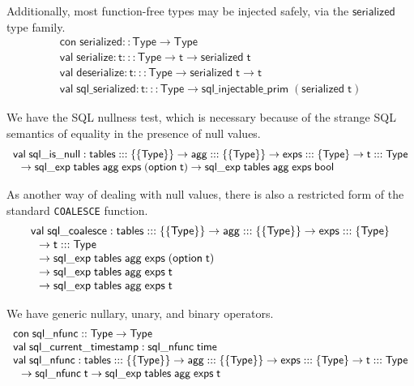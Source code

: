 \documentclass{article}
\newcommand{\cd}[1]{\texttt{#1}}
\newcommand{\mt}[1]{\mathsf{#1}}
\begin{document}
Additionally, most function-free types may be injected safely, via the $\mt{serialized}$ type family.
$$\begin{array}{l}
  \mt{con} \; \mt{serialized} :: \mt{Type} \to \mt{Type} \\
  \mt{val} \; \mt{serialize} : \mt{t} ::: \mt{Type} \to \mt{t} \to \mt{serialized} \; \mt{t} \\
  \mt{val} \; \mt{deserialize} : \mt{t} ::: \mt{Type} \to \mt{serialized} \; \mt{t} \to \mt{t} \\
  \mt{val} \; \mt{sql\_serialized} : \mt{t} ::: \mt{Type} \to \mt{sql\_injectable\_prim} \; (\mt{serialized} \; \mt{t})
\end{array}$$

We have the SQL nullness test, which is necessary because of the strange SQL semantics of equality in the presence of null values.
$$\begin{array}{l}
  \mt{val} \; \mt{sql\_is\_null} : \mt{tables} ::: \{\{\mt{Type}\}\} \to \mt{agg} ::: \{\{\mt{Type}\}\} \to \mt{exps} ::: \{\mt{Type}\} \to \mt{t} ::: \mt{Type} \\
  \hspace{.1in} \to \mt{sql\_exp} \; \mt{tables} \; \mt{agg} \; \mt{exps} \; (\mt{option} \; \mt{t}) \to \mt{sql\_exp} \; \mt{tables} \; \mt{agg} \; \mt{exps} \; \mt{bool}
\end{array}$$

As another way of dealing with null values, there is also a restricted form of the standard \cd{COALESCE} function.
$$\begin{array}{l}
  \mt{val} \; \mt{sql\_coalesce} : \mt{tables} ::: \{\{\mt{Type}\}\} \to \mt{agg} ::: \{\{\mt{Type}\}\} \to \mt{exps} ::: \{\mt{Type}\} \\
  \hspace{.1in} \to \mt{t} ::: \mt{Type} \\
  \hspace{.1in} \to \mt{sql\_exp} \; \mt{tables} \; \mt{agg} \; \mt{exps} \; (\mt{option} \; \mt{t}) \\
  \hspace{.1in} \to \mt{sql\_exp} \; \mt{tables} \; \mt{agg} \; \mt{exps} \; \mt{t} \\
  \hspace{.1in} \to \mt{sql\_exp} \; \mt{tables} \; \mt{agg} \; \mt{exps} \; \mt{t}
\end{array}$$

We have generic nullary, unary, and binary operators.
$$\begin{array}{l}
  \mt{con} \; \mt{sql\_nfunc} :: \mt{Type} \to \mt{Type} \\
  \mt{val} \; \mt{sql\_current\_timestamp} : \mt{sql\_nfunc} \; \mt{time} \\
  \mt{val} \; \mt{sql\_nfunc} : \mt{tables} ::: \{\{\mt{Type}\}\} \to \mt{agg} ::: \{\{\mt{Type}\}\} \to \mt{exps} ::: \{\mt{Type}\} \to \mt{t} ::: \mt{Type} \\
  \hspace{.1in} \to \mt{sql\_nfunc} \; \mt{t} \to \mt{sql\_exp} \; \mt{tables} \; \mt{agg} \; \mt{exps} \; \mt{t} \\\end{array}$$
\end{document}
